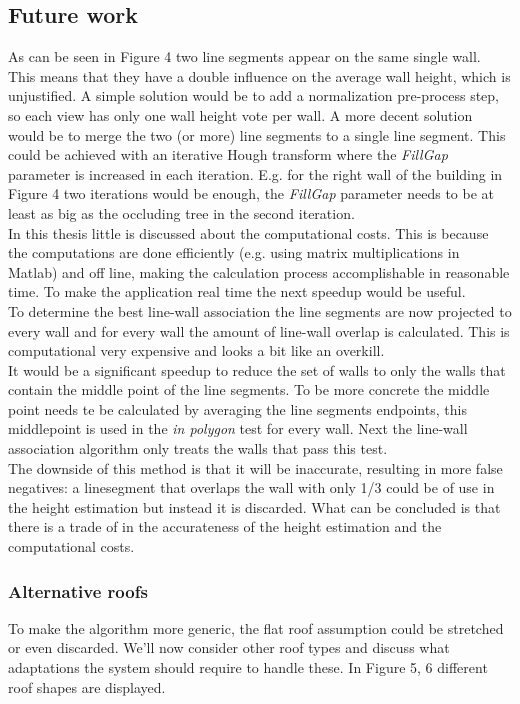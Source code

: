 \documentclass[10pt]{article}
\begin{document}
\subsection{Future work}
As can be seen in Figure 4
two line segments appear on the same single wall. This means that they have a double
influence on the average wall height, which is unjustified. 
A simple solution would be to add a normalization pre-process step, so each view
has only one wall height vote per wall. A more decent solution would be to
merge the two (or more) line segments to a single line segment. This could be
achieved with an iterative Hough transform where the \emph{FillGap} parameter is
increased in each iteration. E.g. for the right wall of the building in Figure 4  %
two iterations would be enough, the \emph{FillGap} parameter needs to be at least as big as the occluding tree in the second iteration.\\

In this thesis little is discussed about the computational costs. This is
because the computations are done efficiently (e.g. using matrix multiplications
in Matlab) and off line, making the calculation process accomplishable in reasonable time.
To make the application real time the next speedup would be useful.\\
To determine the best line-wall association the line segments are now projected to
every wall and for every wall the amount of line-wall overlap is calculated. This
is computational very expensive and looks a bit like an overkill.\\
It would be a significant speedup to reduce the set of walls to only the walls
that contain the middle point of the line segments. To be more concrete the
middle point needs te be calculated by averaging the line segments endpoints,
this middlepoint is used in the \emph{in polygon} test for every wall.  Next the
line-wall association algorithm only treats the walls that pass this test.\\
The downside of this method is that it will be inaccurate, resulting in more false
negatives: a linesegment that overlaps the wall with only 1/3 could be of
use in the height estimation but instead it is discarded.
What can be concluded is that there is a trade of in the accurateness of the
height estimation and the computational costs.


\subsubsection{Alternative roofs}
To make the algorithm more generic, the flat roof assumption could be stretched
or even discarded.  We'll now consider other roof types and discuss what
adaptations the system should require to handle these.  In Figure 5,
6 different roof shapes are displayed.\\
\end{document}
